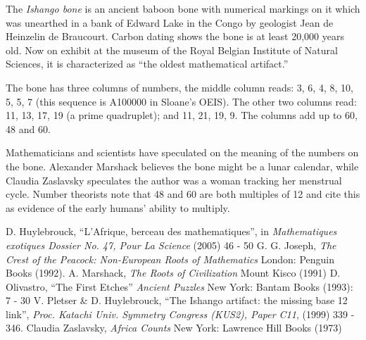 \documentclass[12pt]{article}
\begin{document}
The {\em Ishango bone} is an ancient baboon bone with numerical markings on it which was unearthed in a bank of Edward Lake in the Congo by geologist Jean de Heinzelin de Braucourt. Carbon dating shows the bone is at least 20,000 years old. Now on exhibit at the museum of the Royal Belgian Institute of Natural Sciences, it is characterized as ``the oldest mathematical artifact.''

The bone has three columns of numbers, the middle column reads: 3, 6, 4, 8, 10, 5, 5, 7 (this sequence is A100000 in Sloane's OEIS). The other two columns read: 11, 13, 17, 19 (a prime quadruplet); and 11, 21, 19, 9. The columns add up to 60, 48 and 60.

Mathematicians and scientists have speculated on the meaning of the numbers on the bone. Alexander Marshack believes the bone might be a lunar calendar, while Claudia Zaslavsky speculates the author was a woman tracking her menstrual cycle. Number theorists note that 48 and 60 are both multiples of 12 and cite this as evidence of the early humans' ability to multiply.

\begin{thebibliography}{4}
 D. Huylebrouck, ``L'Afrique, berceau des mathematiques'', in {\it Mathematiques exotiques Dossier No. 47, Pour La Science} (2005) 46 - 50 
 G. G. Joseph, {\it The Crest of the Peacock: Non-European Roots of Mathematics} London: Penguin Books (1992). 
 A. Marshack, {\it The Roots of Civilization} Mount Kisco (1991)
 D. Olivastro, ``The First Etches'' {\it Ancient Puzzles} New York: Bantam Books (1993): 7 - 30 
 V. Pletser \& D. Huylebrouck, ``The Ishango artifact: the missing base 12 link'', {\it Proc. Katachi Univ. Symmetry Congress (KUS2), Paper C11}, (1999) 339 - 346. 
 Claudia Zaslavsky, {\it Africa Counts} New York: Lawrence Hill Books (1973) 
\end{thebibliography}
\end{document}
